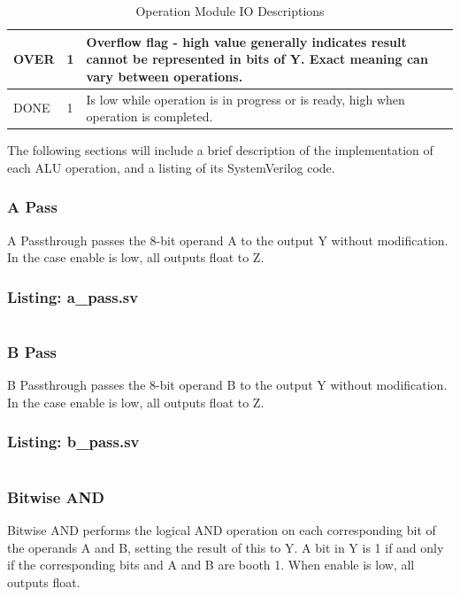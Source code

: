 \documentclass[12pt,letterpaper]{article}
\begin{document}
\begin{table}[h!]
\begin{tabular}{lll}
    \multicolumn{1}{|l|}{OVER}               & \multicolumn{1}{l|}{1}                     & \multicolumn{1}{p{10cm}|}{Overflow flag - high value generally indicates result cannot be represented in bits of Y. Exact meaning can vary between operations.} \\ \hline
    \multicolumn{1}{|l|}{DONE}               & \multicolumn{1}{l|}{1}                     & \multicolumn{1}{p{10cm}|}{Is low while operation is in progress or is ready, high when operation is completed.}                                             \\ \hline
    \end{tabular}
    \caption{Operation Module IO Descriptions}
    \label{operation_io_table}
\end{table}

The following sections will include a brief description of the implementation of each ALU operation, and a listing of its
SystemVerilog code.

\subsubsection{A Pass}
A Passthrough passes the 8-bit operand A to the output Y without modification. In the case enable is low, all outputs float to Z.
\subsubsection*{Listing: a\_pass.sv}
\inputminted[bgcolor = bggray, linenos, fontsize = \footnotesize, breaklines]{sv}{"../ALU_SystemVerilog/functions/a_pass.sv"}


\subsubsection{B Pass}
B Passthrough passes the 8-bit operand B to the output Y without modification. In the case enable is low, all outputs float to Z.
\subsubsection*{Listing: b\_pass.sv}
\inputminted[bgcolor = bggray, linenos, fontsize = \footnotesize, breaklines]{sv}{"../ALU_SystemVerilog/functions/b_pass.sv"}


\subsubsection{Bitwise AND}
Bitwise AND performs the logical AND operation on each corresponding bit of the operands A and B, setting the result of this to Y.
A bit in Y is 1 if and only if the corresponding bits and A and B are booth 1. When enable is low, all outputs float.
\end{document}

